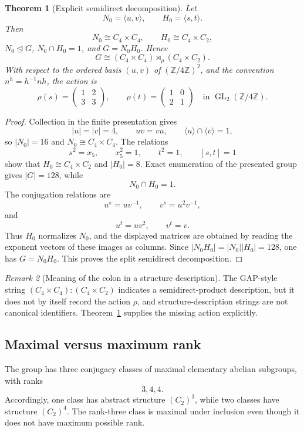 \documentclass[11pt]{amsart}
\newtheorem{theorem}{Theorem}[section]
\theoremstyle{definition}
\theoremstyle{remark}
\newtheorem{remark}[theorem]{Remark}
\newcommand{\Z}{\mathbb Z}
\begin{document}
\begin{theorem}[Explicit semidirect decomposition]
\label{thm:semidirect}
Let
\[
N_0=\langle u,v\rangle,
\qquad
H_0=\langle s,t\rangle.
\]
Then
\[
N_0\cong C_4\times C_4,
\qquad
H_0\cong C_4\times C_2,
\]
\(N_0\trianglelefteq G\), \(N_0\cap H_0=1\), and \(G=N_0H_0\).  Hence
\[
G\cong(C_4\times C_4)\rtimes_{\rho}(C_4\times C_2).
\]
With respect to the ordered basis \((u,v)\) of \((\Z/4\Z)^2\), and the convention \(n^h=h^{-1}nh\), the action is
\[
\rho(s)=
\begin{pmatrix}
1&2\\
3&3
\end{pmatrix},
\qquad
\rho(t)=
\begin{pmatrix}
1&0\\
2&1
\end{pmatrix}
\quad\text{in }\operatorname{GL}_2(\Z/4\Z).
\]
\end{theorem}

\begin{proof}
Collection in the finite presentation gives
\[
|u|=|v|=4,
\qquad uv=vu,
\qquad \langle u\rangle\cap\langle v\rangle=1,
\]
so \(|N_0|=16\) and \(N_0\cong C_4\times C_4\).  The relations
\[
s^2=x_5,\qquad x_5^2=1,
\qquad t^2=1,
\qquad [s,t]=1
\]
show that \(H_0\cong C_4\times C_2\) and \(|H_0|=8\).  Exact enumeration of the presented group gives \(|G|=128\), while
\[
N_0\cap H_0=1.
\]
The conjugation relations are
\[
u^s=uv^{-1},\qquad v^s=u^2v^{-1},
\]
and
\[
u^t=uv^2,\qquad v^t=v.
\]
Thus \(H_0\) normalizes \(N_0\), and the displayed matrices are obtained by reading the exponent vectors of these images as columns.  Since
\(|N_0H_0|=|N_0||H_0|=128\), one has \(G=N_0H_0\).  This proves the split semidirect decomposition.
\end{proof}

\begin{remark}[Meaning of the colon in a structure description]
The GAP-style string
\((C_4\times C_4):(C_4\times C_2)\) indicates a semidirect-product description, but it does not by itself record the action \(\rho\), and structure-description strings are not canonical identifiers.  Theorem~\ref{thm:semidirect} supplies the missing action explicitly.
\end{remark}

\subsection{Maximal versus maximum rank}

The group has three conjugacy classes of maximal elementary abelian subgroups, with ranks
\[
3,4,4.
\]
Accordingly, one class has abstract structure \((C_2)^3\), while two classes have structure \((C_2)^4\).  The rank-three class is maximal under inclusion even though it does not have maximum possible rank.
\end{document}
